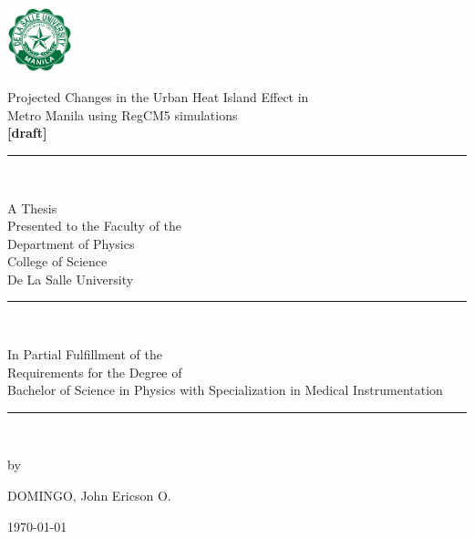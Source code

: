 \begin{center}

	\includegraphics[width=0.14\textwidth]{../format/DLSU_Logo} 
	\vspace{4ex}
	
	\begin{Spacing}{1.5} 
		Projected Changes in the Urban Heat Island Effect in \\
		Metro Manila using RegCM5 simulations \\
		\textbf{[draft]}
	\end{Spacing}
	\vfill
	
	\rule{3cm}{0.5pt}\\
	\vfill
	
	
	A Thesis \\
	Presented to the Faculty of the \\
	Department of Physics \\
	College of Science \\
	De La Salle University \\
	\vfill
	
	\rule{3cm}{0.5pt}\\
	\vfill
	
	In Partial Fulfillment of the\\
	Requirements for the Degree of\\
	Bachelor of Science in Physics with Specialization in Medical Instrumentation\\
	\vfill
	
	\rule{3cm}{0.5pt}\\
	\vfill
	
	by \\
	\vspace{2.5ex}
	
	DOMINGO, John Ericson O.
	\vspace{2.5ex}
	
	\today \\
\end{center}

\clearpage